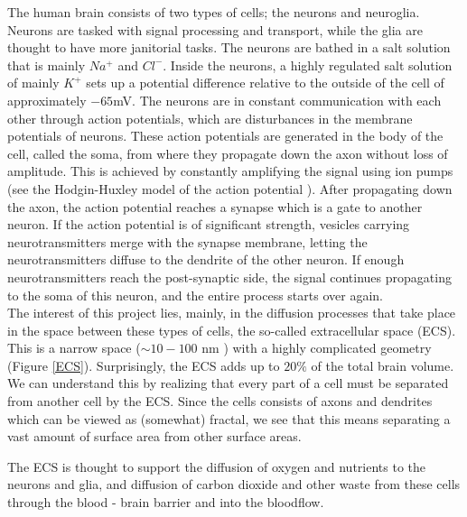 The human brain consists of two types of cells; the neurons and neuroglia. 
Neurons are tasked with signal processing and transport, while the glia are thought to have more janitorial tasks. 
The neurons are bathed in a salt solution that is mainly $Na^+$ and $Cl^-$. 
Inside the neurons, a highly regulated salt solution of mainly $K^+$ sets up a potential difference relative to the outside of the cell of approximately $-65$mV.
The neurons are in constant communication with each other through action potentials, which are disturbances in the membrane potentials of neurons. 
These action potentials are generated in the body of the cell, called the soma, from where they propagate down the axon without loss of amplitude. 
This is achieved by constantly amplifying the signal using ion pumps (see the Hodgin-Huxley model of the action potential \cite{graham2011principles}).
After propagating down the axon, the action potential reaches a synapse which is a gate to another neuron. 
If the action potential is of significant strength, vesicles carrying neurotransmitters merge with the synapse membrane, letting the neurotransmitters diffuse to the dendrite of the other neuron. 
If enough neurotransmitters reach the post-synaptic side, the signal continues propagating to the soma of this neuron, and the entire process starts over again. \\
The interest of this project lies, mainly, in the diffusion processes that take place in the space between these types of cells, the so-called extracellular space (ECS). 
This is a narrow space ($\sim 10-100$ nm \cite{nicholson2001diffusion}) with a highly complicated geometry (Figure \ref{ECS}). 
Surprisingly, the ECS adds up to $20\%$ of the total brain volume. 
We can understand this by realizing that every part of a cell must be separated from another cell by the ECS. 
Since the cells consists of axons and dendrites which can be viewed as (somewhat) fractal, we see that this means separating a vast amount of surface area from other surface areas.

The ECS is thought to support the diffusion of oxygen and nutrients to the neurons and glia, and diffusion of carbon dioxide and other waste from these cells through the blood - brain barrier and into the bloodflow. 



